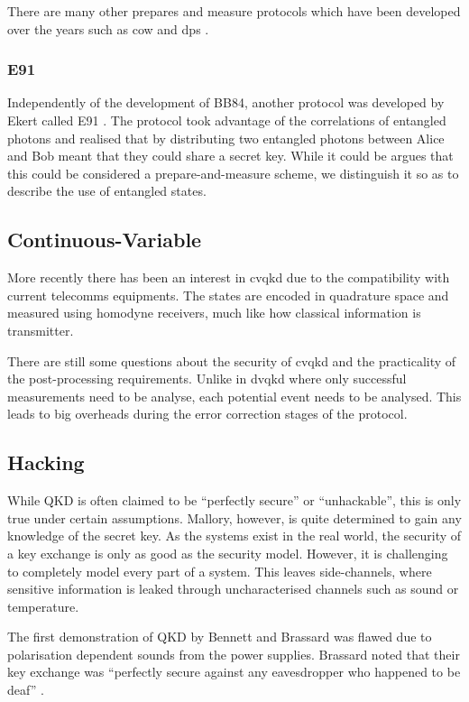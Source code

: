 There are many other prepares and measure protocols which have been developed over the years such as \ac{cow} \cite{COW-QKD} and \ac{dps} \cite{DPS-QKD}.

\subsubsection*{E91}

Independently of the development of BB84, another protocol was developed by Ekert called E91 \cite{E91}. The protocol took advantage of the correlations of entangled photons and realised that by distributing two entangled photons between Alice and Bob meant that they could share a secret key. While it could be argues that this could be considered a prepare-and-measure scheme, we distinguish it so as to describe the use of entangled states.

\subsection{Continuous-Variable}

More recently there has been an interest in \ac{cvqkd} due to the compatibility with current telecomms equipments. The states are encoded in quadrature space and measured using homodyne receivers, much like how classical information is transmitter.

There are still some questions about the security of \ac{cvqkd} and the practicality of the post-processing requirements. Unlike in \ac{dvqkd} where only successful measurements need to be analyse, each potential event needs to be analysed. This leads to big overheads during the error correction stages of the protocol.

\subsection{Hacking}

While \ac{QKD} is often claimed to be ``perfectly secure'' or ``unhackable'', this is only true under certain assumptions.  Mallory, however, is quite determined to gain any knowledge of the secret key. As the systems exist in the real world, the security of a key exchange is only as good as the security model. However, it is challenging to completely model every part of a system. This leaves side-channels, where sensitive information is leaked through uncharacterised channels such as sound or temperature.

The first demonstration of \ac{QKD} by Bennett and Brassard was flawed due to polarisation dependent sounds from the power supplies. Brassard noted that their key exchange was ``perfectly secure against any eavesdropper who happened to be deaf'' \cite{Brassard2005}. 


